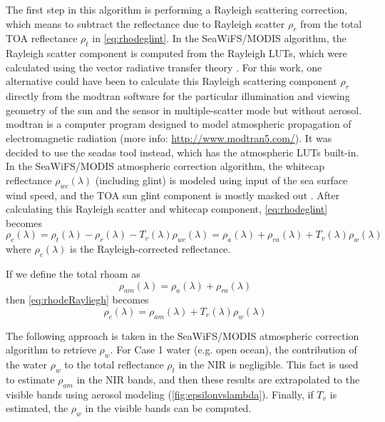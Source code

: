 The first step in this algorithm is performing a Rayleigh scattering correction, which means to subtract the reflectance due to Rayleigh scatter $\rho_r$ from the total TOA reflectance $\rho_t$ in \autoref{eq:rhodeglint}. In the SeaWiFS/MODIS algorithm, the Rayleigh scatter component is computed from the Rayleigh LUTs, which were calculated using the vector radiative transfer theory \citep{Wang:1991,IOCCG:2010}. For this work, one alternative could have been to calculate this Rayleigh scattering component $\rho_r$ directly from the \gls{modtran} software for the particular illumination and viewing geometry of the sun and the sensor in multiple-scatter mode but without aerosol. \gls{modtran} is a computer program designed to model atmospheric propagation of electromagnetic radiation \citep{Berk:1989fk} (more info: \url{http://www.modtran5.com/}). It was decided to use the \gls{seadas} tool instead, which has the atmospheric LUTs built-in. In the SeaWiFS/MODIS atmospheric correction algorithm, the whitecap reflectance $\rho_{wc}(\lambda)$ (including glint) is modeled using input of the sea surface wind speed, and the TOA sun glint component is mostly masked out \citep{IOCCG:2010}. After calculating this Rayleigh scatter and whitecap component, \autoref{eq:rhodeglint} becomes 
\begin{equation}\label{eq:rhodeRayliegh}
 \rho_c(\lambda) = \rho_t(\lambda)-\rho_r(\lambda)-T_v(\lambda)\rho_{wc}(\lambda) = \rho_a(\lambda)+\rho_{ra}(\lambda)+T_v(\lambda)\rho_{w}(\lambda)
\end{equation}
where $\rho_c(\lambda)$ is the Rayleigh-corrected reflectance. 

If we define the total \gls{rhoam} as
\begin{equation}\label{eq:rhoam1}
  \rho_{am}(\lambda) = \rho_a(\lambda)+\rho_{ra}(\lambda)
\end{equation}
then \autoref{eq:rhodeRayliegh} becomes
\begin{equation}\label{eq:rhoam}
 \rho_c(\lambda) = \rho_{am}(\lambda) + T_v(\lambda)\rho_{w}(\lambda)
\end{equation}

The following approach is taken in the SeaWiFS/MODIS atmospheric correction algorithm to retrieve $\rho_w$. For Case 1 water (e.g. open ocean), the contribution of the water $\rho_{w}$ to the total reflectance $\rho_t$ in the NIR is negligible. This fact is used to estimate $\rho_{am}$ in the NIR bands, and then these results are extrapolated to the visible bands using aerosol modeling (\autoref{fig:epsilonvslambda}). Finally, if $T_v$ is estimated, the $\rho_w$ in the visible bands can be computed.

